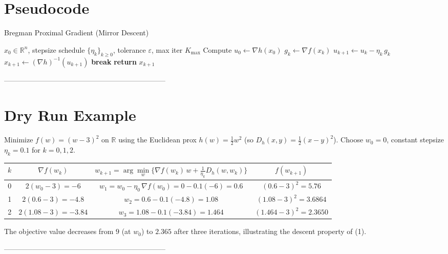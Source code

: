 \documentclass{article}
\newcommand{\R}{\mathbb{R}}
\newcommand{\grad}{\nabla}
\begin{document}
\section*{Pseudocode}
\begin{algorithm}[H]
\caption{Bregman Proximal Gradient (Mirror Descent)}\label{alg:mpg}
\begin{algorithmic}[1]
\Require $x_{0}\in\R^{n}$, stepsize schedule $\{\eta_{k}\}_{k\ge0}$, tolerance $\varepsilon$, max iter $K_{\max}$
\State Compute $u_{0}\gets \grad h(x_{0})$
    \State $g_{k}\gets \grad f(x_{k})$                         
    \State $u_{k+1}\gets u_{k} - \eta_{k}\,g_{k}$              
    \State $x_{k+1}\gets (\grad h)^{-1}(u_{k+1})$              
        \State \textbf{break}
    \EndIf
\EndFor
\State \textbf{return} $x_{k+1}$
\end{algorithmic}
\end{algorithm}

--------------------------------------------------------------------

\section*{Dry Run Example}
Minimize $f(w)=(w-3)^{2}$ on $\R$ using the Euclidean prox $h(w)=\tfrac12 w^{2}$ (so $D_{h}(x,y)=\tfrac12 (x-y)^{2}$).  
Choose $w_{0}=0$, constant stepsize $\eta_{k}=0.1$ for $k=0,1,2$.

\begin{center}
\begin{tabular}{c|c|c|c}
$k$ & $\grad f(w_{k})$ & $w_{k+1}= \arg\min\limits_{w}\{\grad f(w_{k})\,w+\tfrac1{\eta_{k}}D_{h}(w,w_{k})\}$ & $f(w_{k+1})$\\\hline
0 & $2(w_{0}-3)=-6$ & $w_{1}= w_{0}-\eta_{0}\,\grad f(w_{0}) =0-0.1(-6)=0.6$ & $(0.6-3)^{2}=5.76$\\
1 & $2(0.6-3)=-4.8$ & $w_{2}=0.6-0.1(-4.8)=1.08$ & $(1.08-3)^{2}=3.6864$\\
2 & $2(1.08-3)=-3.84$ & $w_{3}=1.08-0.1(-3.84)=1.464$ & $(1.464-3)^{2}=2.3650$
\end{tabular}
\end{center}
The objective value decreases from $9$ (at $w_{0}$) to $2.365$ after three iterations, illustrating the descent property of (1).

--------------------------------------------------------------------
\end{document}
